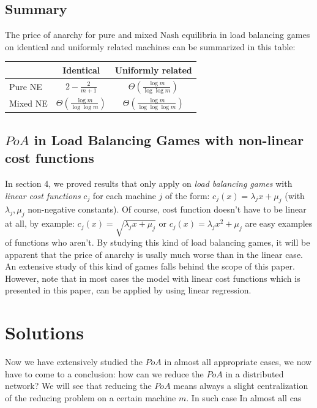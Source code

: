 \documentclass[a4paper,11pt]{article}
\begin{document}
\subsection{Summary}
The price of anarchy for pure and mixed Nash equilibria in load balancing games on identical and uniformly related machines can be summarized in this table:

\begin{center}
\begin{tabular}{l|c|c}

   & Identical & Uniformly related \\
   \hline

   \hline
  Pure NE & $2-\frac{2}{m+1}$ & $\Theta\left(\frac{\log m}{\log \log m}\right)$ \\
  \hline
  Mixed NE & $\Theta\left(\frac{\log m}{\log \log m}\right)$ & $\Theta\left(\frac{\log m}{\log \log \log m}\right)$ \\
  \hline
\end{tabular}
\end{center}
\subsection{$PoA$ in Load Balancing Games with non-linear cost functions}
In section 4, we proved results that only apply on \emph{load balancing games} with \emph{linear cost functions} $c_j$ for each machine $j$ of the form: $c_j(x) = \lambda_jx+\mu_j$ (with $\lambda_j, \mu_j$ non-negative constants). Of course, cost function doesn't have to be linear at all, by example: $c_j(x) = \sqrt{\lambda_jx+\mu_j}$ or $c_j(x) =\lambda_jx^2+\mu_j$ are easy examples of functions who aren't. By studying this kind of load balancing games, it will be apparent that the price of anarchy is usally much worse than in the linear case. An extensive study of this kind of games falls behind the scope of this paper. However, note that in most cases the model with linear cost functions which is presented in this paper, can be applied by using linear regression. 
\section{Solutions}
Now we have extensively studied the $PoA$ in almost all appropriate cases, we now have to come to a conclusion: how can we reduce the $PoA$ in a distributed network? We will see that reducing the $PoA$ means always a slight centralization of the reducing problem on a certain machine $m$. In such case In almost all cas
\end{document}
